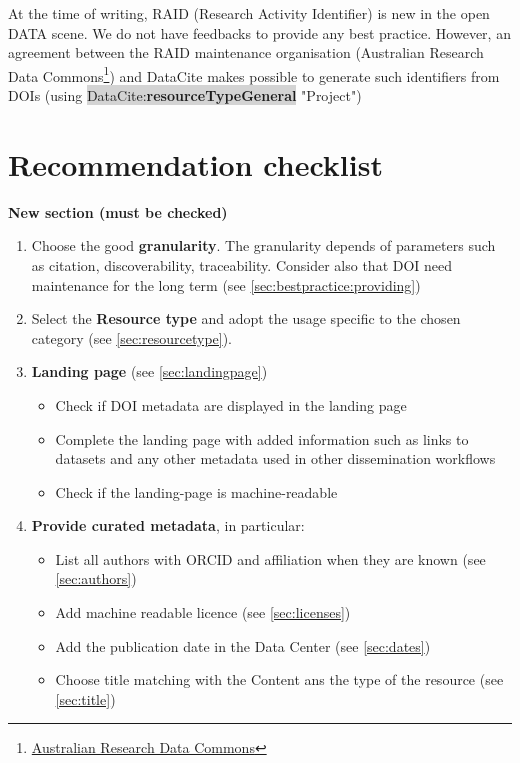 \documentclass[11pt,a4paper]{ivoa}
\newcommand{\dataciteterm}[1]{\colorbox{lightgray}{DataCite:\textbf{#1}}}
\begin{document}
At the time of writing, RAID (Research Activity Identifier) is new in the open DATA scene. We do not have feedbacks to provide any best practice. However, an agreement between the RAID maintenance organisation (Australian Research Data Commons\footnote{\url{ Australian Research Data Commons}}) and DataCite makes possible to generate such identifiers from DOIs (using \dataciteterm{resourceTypeGeneral} "Project")


\section{Recommendation checklist}
\textbf{\color{red}New section (must be checked)}

\begin{enumerate}
	\item Choose the good \textbf{granularity}. The granularity depends of parameters such as citation, discoverability, traceability. Consider also that DOI need maintenance for the long term (see \ref{sec:bestpractice:providing})
	\item Select the \textbf{Resource type} and adopt the usage specific to the chosen category (see \ref{sec:resourcetype}).
	\item \textbf{Landing page} (see \ref{sec:landingpage})
	\begin{itemize}
		\item Check if DOI metadata are displayed in the landing page 
		\item Complete the landing page with added information such as links to datasets and any other metadata used in other dissemination workflows
		\item Check if the landing-page is machine-readable
	\end{itemize}
	\item \textbf{Provide curated metadata}, in particular:
	\begin{itemize}
		\item List all authors with ORCID and affiliation when they are known (see \ref{sec:authors})
		\item Add machine readable licence (see \ref{sec:licenses})
		\item Add the publication date in the Data Center (see \ref{sec:dates})
		\item Choose title  matching with the Content ans the type of the resource  (see \ref{sec:title})
	\end{itemize}

\end{enumerate}
\end{document}
